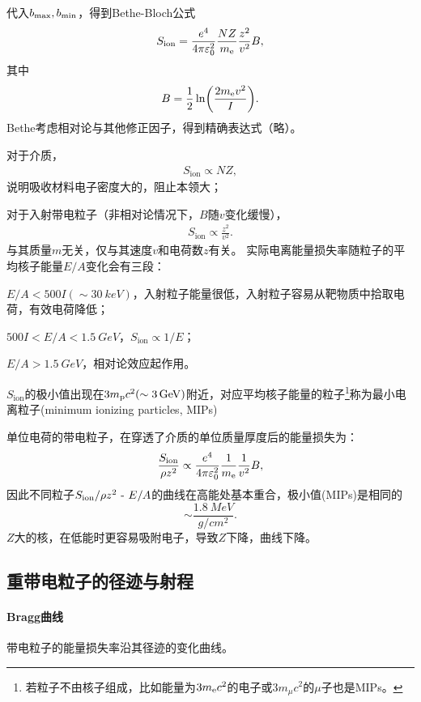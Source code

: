 代入$b_\mathrm{max},b_\mathrm{min}$，得到Bethe-Bloch公式
\begin{align}\label{Bethe-formula}
	S_{\mathrm{ion}}=\frac{e^4}{4\pi\varepsilon_0^2}\frac{NZ}{m_\mathrm e}\frac{z^2}{v^2}B,
\end{align}
其中 
\[
	B=\frac12\ln\biggl(\frac{2m_\mathrm e v^2}I\biggr).
\]
Bethe考虑相对论与其他修正因子，得到精确表达式（略）。


对于介质，
\begin{align}
	S_{\mathrm{ion}}\propto NZ,
\end{align}
说明吸收材料电子密度大的，阻止本领大；

对于入射带电粒子（非相对论情况下，$B$随$v$变化缓慢），
\begin{align}
	S_{\mathrm{ion}}\propto\frac{z^2}{v^2}.
\end{align}
与其质量$m$无关，仅与其速度$v$和电荷数$z$有关。
\newpage
实际电离能量损失率随粒子的平均核子能量$E/A$变化会有三段：
\begin{compactenum}
	\item $E/A<500I(\sim\SI{30}{keV})$，入射粒子能量很低，入射粒子容易从靶物质中拾取电荷，有效电荷降低；
	\item $500I<E/A<\SI{1.5}{GeV}$，$S_{\mathrm{ion}}\propto1/E$；
	\item $E/A>\SI{1.5}{GeV}$，相对论效应起作用。
\end{compactenum}
$S_{\mathrm{ion}}$的极小值出现在$3m_\mathrm p c^2(\sim\SI{3}{GeV})$附近，对应平均核子能量的粒子\footnote{若粒子不由核子组成，比如能量为$3m_\mathrm e c^2$的电子或$3m_\mu c^2$的$\mu$子也是MIPs。}称为最小电离粒子(minimum ionizing particles, MIPs)

单位电荷的带电粒子，在穿透了介质的单位质量厚度后的能量损失为：
\[
	\frac{S_{\mathrm{ion}}}{\rho z^2}\propto\frac{e^4}{4\pi\varepsilon_0^2}\frac{1}{m_\mathrm e}\frac{1}{v^2}B,
\]
因此不同粒子$S_{\mathrm{ion}}/\rho z^2~\text{-}~ E/A$的曲线在高能处基本重合，极小值(MIPs)是相同的
\[
	\sim\frac{\SI{1.8}{MeV}}{\si{g/cm^2}}.
\]
$Z$大的核，在低能时更容易吸附电子，导致$Z$下降，曲线下降。

\subsection{重带电粒子的径迹与射程}

\paragraph{Bragg曲线}带电粒子的能量损失率沿其径迹的变化曲线。

